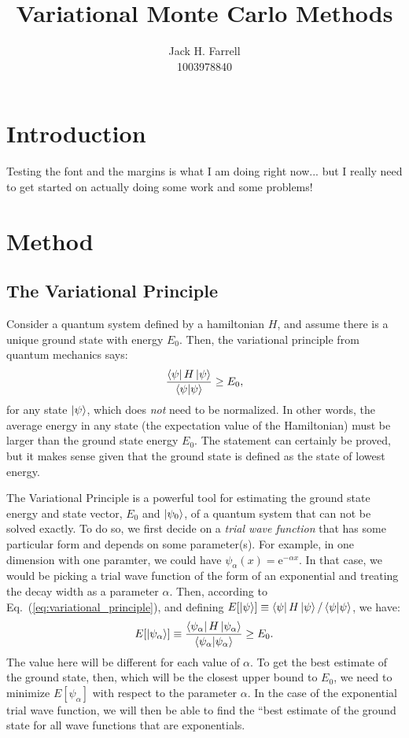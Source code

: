 \documentclass[12pt]{article}
\title{Variational Monte Carlo Methods}
\author{Jack H. Farrell \\ 1003978840}
\date{}
\newcommand{\e}{\mathrm{e}}
\numberwithin{equation}{section}
\begin{document}
\maketitle

\section{Introduction}
Testing the font and the margins is what I am doing right now... but I really need to get started on actually doing some work and some problems!

\section{Method}
\subsection{The Variational Principle}
Consider a quantum system defined by a hamiltonian $H$, and assume there is a unique ground state with energy $E_0$.  Then, the variational principle from quantum mechanics says:
\begin{equation}
    \label{eq:variational_principle}
    \frac{\bra\psi H \ket\psi}{\braket{\psi}{\psi}} \geq E_0,
\end{equation}
for any state $\ket\psi$, which does \textit{not} need to be normalized.  In other words, the average energy in any state (the expectation value of the Hamiltonian) must be larger than the ground state energy $E_0$.  The statement can certainly be proved, but it makes sense given that the ground state is defined as the state of lowest energy.

The Variational Principle is a powerful tool for estimating the ground state energy and state vector, $E_0$ and $\ket{\psi_0}$, of a quantum system that can not be solved exactly. To do so, we first decide on a \textit{trial wave function} that has some particular form and depends on some parameter(s).  For example, in one dimension with one paramter, we could have $\psi_\alpha(x) = \e ^{-\alpha x}$. In that case, we would be picking a trial wave function of the form of an exponential and treating the decay width as a parameter $\alpha$. Then, according to Eq.~(\ref{eq:variational_principle}), and defining $E[\ket\psi] \equiv \bra\psi H \ket\psi / \braket{\psi}{\psi}$, we have:
\begin{equation}
    E[\ket{\psi_\alpha}] \equiv \frac{\bra{\psi_\alpha} H \ket{\psi_\alpha}}{\braket{\psi_\alpha}{\psi_\alpha}} \geq E_0.
\end{equation}
The value here will be different for each value of $\alpha$.  To get the best estimate of the ground state, then, which will be the closest upper bound to $E_0$, we need to minimize $E[\psi_\alpha]$ with respect to the parameter $\alpha$.  In the case of the exponential trial wave function, we will then be able to find the ``best estimate of the ground state for all wave functions that are exponentials.
\end{document}
